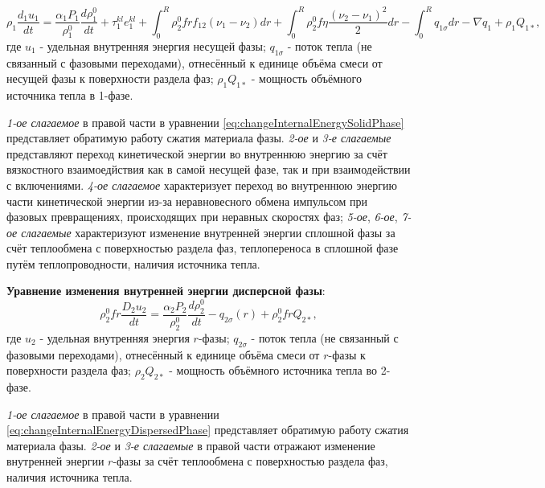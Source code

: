 \documentclass[12pt, a4paper]{report}
\begin{document}
	\begin{equation}\label{eq:changeInternalEnergySolidPhase}
		\rho_{1} \frac{d_{1} u_{1}}{dt} = \frac{\alpha_{1} P_{1}}{\rho_{1}^{0}}\frac{d \rho_{1}^{0}}{dt} + \tau_{1}^{kl} e_{1}^{kl} + \int_{0}^{R} \rho_{2}^{0} f r f_{12} (\nu_{1} - \nu_{2}) dr + \int_{0}^{R} \rho_{2}^{0} f \eta \frac{(\nu_{2} - \nu_{1})^{2}}{2} dr - \int_{0}^{R} q_{1 \sigma} dr - \nabla q_{1} + \rho_{1} Q_{1*},
	\end{equation}
	\large
	где $u_{1}$ - удельная внутренняя энергия несущей фазы; $q_{1 \sigma}$ - поток тепла (не связанный с фазовыми переходами), отнесённый к единице объёма смеси от несущей фазы к поверхности раздела фаз; $\rho_{1} Q_{1*}$ - мощность объёмного источника тепла в 1-фазе. \par
	\textit{1-ое слагаемое} в правой части в уравнении \eqref{eq:changeInternalEnergySolidPhase} представляет обратимую работу сжатия материала фазы. \textit{2-ое} и \textit{3-е слагаемые} представляют переход кинетической энергии во внутреннюю энергию за счёт вязкостного взаимоедйствия как в самой несущей фазе, так и при взаимодействии с включениями. \textit{4-ое слагаемое} характеризует переход во внутреннюю энергию части кинетической энергии из-за неравновесного обмена импульсом при фазовых превращениях, происходящих при неравных скоростях фаз; \textit{5-ое}, \textit{6-ое}, \textit{7-ое слагаемые} характеризуют изменение внутренней энергии сплошной фазы за счёт теплообмена с поверхностью раздела фаз, теплопереноса в сплошной фазе путём теплопроводности, наличия источника тепла. \par
	\textbf{Уравнение изменения внутренней энергии дисперсной фазы}:
	\begin{equation}\label{eq:changeInternalEnergyDispersedPhase}
		\rho_{2}^{0} f r \frac{D_{2} u_{2}}{dt} = \frac{\alpha_{2} P_{2}}{\rho_{2}^{0}}\frac{d \rho_{2}^{0}}{dt} - q_{2 \sigma}(r) + \rho_{2}^{0} f r Q_{2*},
	\end{equation}
	где $u_{2}$ - удельная внутренняя энергия $r$-фазы; $q_{2 \sigma}$ - поток тепла (не связанный с фазовыми переходами), отнесённый к единице объёма смеси от $r$-фазы к поверхности раздела фаз; $\rho_{2} Q_{2*}$ - мощность объёмного источника тепла во 2-фазе. \par
	\textit{1-ое слагаемое} в правой части в уравнении \eqref{eq:changeInternalEnergyDispersedPhase} представляет обратимую работу сжатия материала фазы. \textit{2-ое} и \textit{3-е слагаемые} в правой части отражают изменение внутренней энергии $r$-фазы за счёт теплообмена с поверхностью раздела фаз, наличия источника тепла. \par
\end{document}
